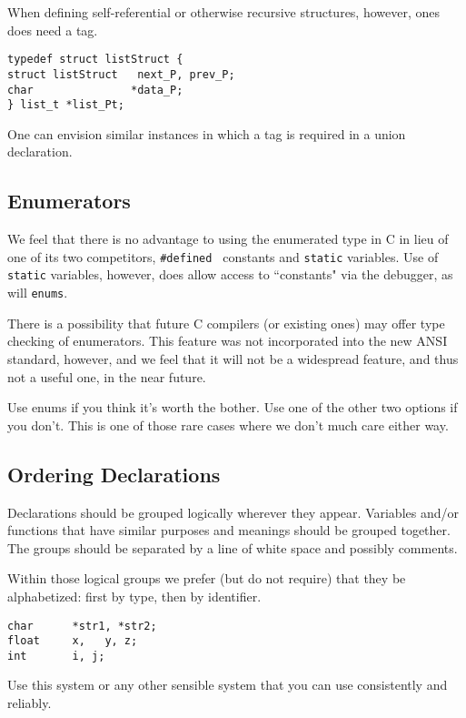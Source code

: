 When defining self-referential or otherwise recursive
structures, however, ones does need a tag.

\begin{verbatim}
typedef struct listStruct {
struct listStruct   next_P, prev_P;
char               *data_P;
} list_t *list_Pt;
\end{verbatim}

One can envision similar instances in which a tag is required in a
union declaration.

\subsection{Enumerators}

We feel that there is no advantage to using the enumerated type in C
in lieu of one of its two competitors, {\tt \#defined } constants and
{\tt static} variables.  Use of {\tt static} variables, however, does
allow access to ``constants" via the debugger, as will {\tt enums}.

There is a possibility that future C compilers (or existing ones) may
offer type checking of enumerators.  This feature was not incorporated
into the new ANSI standard, however, and we feel that it will not be a
widespread feature, and thus not a useful one, in the near future.

Use enums if you think it's worth the bother.  Use one of the other
two options if you don't.  This is one of those rare cases where we
don't much care either way.

\subsection{Ordering Declarations}

Declarations should be grouped logically wherever they appear.
Variables and/or functions that have similar purposes and meanings
should be grouped together.  The groups should be separated by a line
of white space and possibly comments.

Within those logical groups we prefer (but do not require) that they be
alphabetized:  first by type, then by identifier.

\begin{verbatim}
char      *str1, *str2;
float     x,   y, z;
int       i, j;\end{verbatim}

Use this system or any other sensible system that you can use consistently and
reliably.

